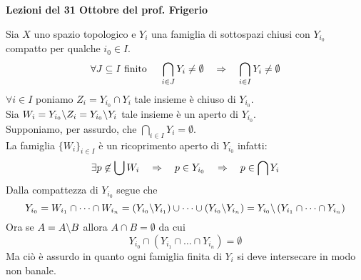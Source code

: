  

\textbf{Lezioni del 31  Ottobre del prof. Frigerio}
\begin{thm}Sia $X$ uno spazio topologico e $Y_i$ una famiglia di sottospazi chiusi con $Y_{i_0}$ compatto per qualche $i_0 \in I$.
$$\forall J \subseteq I \text{ finito } \quad  \bigcap_{i \in J } Y_i \neq \emptyset \quad \Rightarrow \quad \bigcap_{i \in I } Y_i \neq \emptyset$$
\proof $\forall i \in I$ poniamo $Z_i = Y_{i_0} \cap Y_i$ tale insieme \`e chiuso di $Y_{i_0}$.\\
Sia  $W_i = Y_{i_0} \backslash Z_i  = Y_{i_0}\backslash Y_i$ tale insieme \`e un aperto di $Y_{i_0}$.\\
Supponiamo, per assurdo, che $\bigcap_{i \in I }Y_i=\emptyset$.\\
La famiglia $\{W_i\}_{i \in I}$ \`e un ricoprimento aperto di $Y_{i_0}$ infatti: 
$$ \exists p \not \in \bigcup W_i \quad \Rightarrow \quad p\in Y_{i_0} \quad \Rightarrow \quad p \in \bigcap Y_i $$
Dalla compattezza di $Y_{i_0}$ segue che $$Y_{i_0}= W_{i_1}\cap \dots \cap W_{i_n} = \left( Y_{i_0} \backslash Y_{i_1} \right) \cup \dots \cup \left( Y_{i_0} \backslash Y_{i_n} \right) = Y_{i_0}\backslash \left( Y_{i_1} \cap \dots \cap Y_{i_n} \right)$$
Ora se $A = A\backslash B $ allora $A\cap B = \emptyset $ da cui
$$ Y_{i_0} \cap \left( Y_{i_1} \cap \dots \cap Y_{i_n} \right)=\emptyset$$
Ma ci\`o \`e assurdo in quanto ogni famiglia finita di $Y_i$ si deve intersecare in modo non banale.\\
\endproof
\end{thm}

